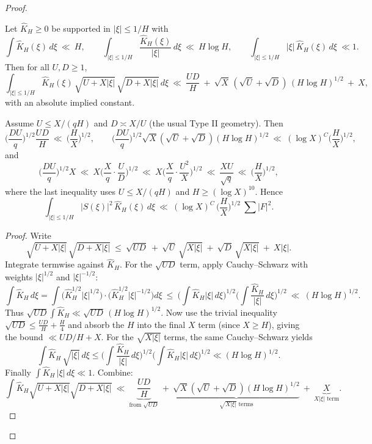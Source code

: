 \begin{proof}
\begin{lemma}\label{lem:balanced-xi}
Let $\widehat K_H\ge0$ be supported in $|\xi|\le 1/H$ with
\begin{equation}\label{eq:K-moments}
\int \widehat K_H(\xi)\,d\xi\ \ll\ H,\qquad 
\int_{|\xi|\le 1/H} \frac{\widehat K_H(\xi)}{|\xi|}\,d\xi\ \ll\ H\log H,\qquad 
\int_{|\xi|\le 1/H} |\xi|\,\widehat K_H(\xi)\,d\xi\ \ll 1.
\end{equation}
Then for all $U,D\ge 1$,
\begin{equation}\label{eq:balanced-claim}
\int_{|\xi|\le 1/H} \widehat K_H(\xi)\,\sqrt{U+X|\xi|}\,\sqrt{D+X|\xi|}\,d\xi
\ \ll\ \frac{UD}{H}\ +\ \sqrt{X}\,(\sqrt U+\sqrt D)\,(H\log H)^{1/2}\ +\ X,
\end{equation}
with an absolute implied constant.
\end{lemma}

\begin{corollary}\label{cor:short-axis}
Assume $U\le X/(qH)$ and $D\asymp X/U$ (the usual Type II geometry). Then
\[
\Big(\frac{DU}{q}\Big)^{\!1/2}\frac{UD}{H}\ \ll\ \Big(\frac{H}{X}\Big)^{\!1/2},\qquad
\Big(\frac{DU}{q}\Big)^{\!1/2}\sqrt{X}(\sqrt U+\sqrt D)(H\log H)^{1/2}\ \ll\ (\log X)^{C}\Big(\frac{H}{X}\Big)^{\!1/2},
\]
and
\[
\Big(\frac{DU}{q}\Big)^{\!1/2} X\ \ll\ X\Big(\frac{X}{q}\cdot\frac{U}{D}\Big)^{\!1/2}\ \ll\ X\Big(\frac{X}{q}\cdot\frac{U^2}{X}\Big)^{\!1/2}\ \ll\ \frac{XU}{\sqrt q}\ \ll\ \Big(\frac{H}{X}\Big)^{\!1/2},
\]
where the last inequality uses $U\le X/(qH)$ and $H\ge (\log X)^{10}$. Hence
\[
\int_{|\xi|\le 1/H} |S(\xi)|^2\,\widehat K_H(\xi)\,d\xi\ \ll\ (\log X)^C\,\Big(\frac{H}{X}\Big)^{1/2}\ \sum|F|^2.
\]
\end{corollary}

\begin{proof}
Write
\[
\sqrt{U+X|\xi|}\,\sqrt{D+X|\xi|}\ \le\ \sqrt{UD}\ +\ \sqrt U\,\sqrt{X|\xi|}\ +\ \sqrt D\,\sqrt{X|\xi|}\ +\ X|\xi|.
\]
Integrate termwise against $\widehat K_H$. For the $\sqrt{UD}$ term, apply Cauchy--Schwarz with weights $|\xi|^{1/2}$ and $|\xi|^{-1/2}$:
\[
\int \widehat K_H\,d\xi
= \int \big(\widehat K_H^{1/2}|\xi|^{1/2}\big)\cdot\big(\widehat K_H^{1/2}|\xi|^{-1/2}\big)d\xi
\ \le\ \Big(\int \widehat K_H |\xi|\,d\xi\Big)^{\!1/2}\Big(\int \frac{\widehat K_H}{|\xi|}\,d\xi\Big)^{\!1/2}
\ \ll\ (H\log H)^{1/2}.
\]
Thus $\sqrt{UD}\int \widehat K_H \ll \sqrt{UD}\,(H\log H)^{1/2}$. Now use the trivial inequality $\sqrt{UD}\le \tfrac{UD}{H}+ \tfrac{H}{4}$ and absorb the $H$ into the final $X$ term (since $X\ge H$), giving the bound $\ll UD/H+X$. For the $\sqrt{X|\xi|}$ terms, the same Cauchy--Schwarz yields
\[
\int \widehat K_H\,\sqrt{|\xi|}\,d\xi
\le \Big(\int \frac{\widehat K_H}{|\xi|}\,d\xi\Big)^{\!1/2}\Big(\int \widehat K_H|\xi|\,d\xi\Big)^{\!1/2}
\ll (H\log H)^{1/2}.
\]
Finally $\int \widehat K_H\,|\xi|\,d\xi\ll 1$. Combine:
\[
\int \widehat K_H \sqrt{U+X|\xi|}\sqrt{D+X|\xi|}\ \ll\ 
\underbrace{\frac{UD}{H}}_{\text{from }\sqrt{UD}}\ +\ 
\underbrace{\sqrt{X}(\sqrt U+\sqrt D)(H\log H)^{1/2}}_{\sqrt{X|\xi|}\text{ terms}}\ +\
\underbrace{X}_{X|\xi|\text{ term}}.
\]
\end{proof}


\end{proof}
